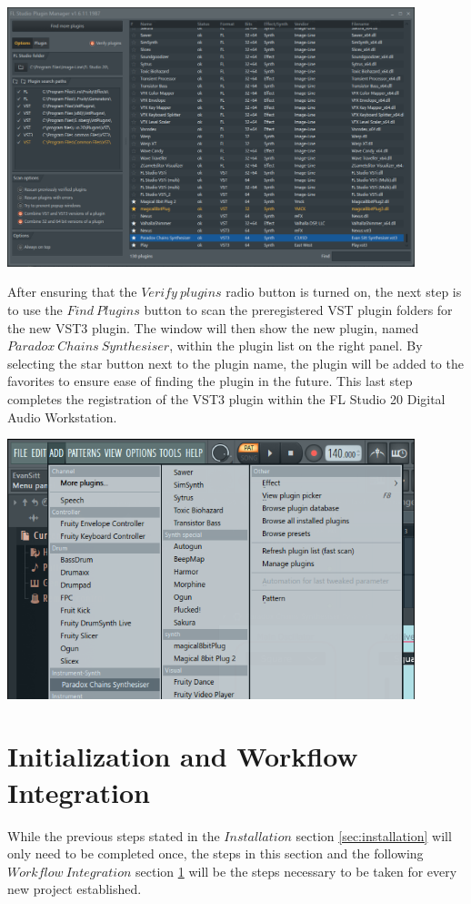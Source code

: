 \documentclass[a4paper,12pt]{report}
\begin{document}
\begin{center}
\includegraphics[width=32em]{ModuleRegistration.png}
\end{center}

After ensuring that the $Verify\ plugins$ radio button is turned on, the next step is to use the $Find\ Plugins$ button to scan the preregistered VST plugin folders for the new VST3 plugin. The window will then show the new plugin, named $Paradox\ Chains\ Synthesiser$, within the plugin list on the right panel. By selecting the star button next to the plugin name, the plugin will be added to the favorites to ensure ease of finding the plugin in the future. This last step completes the registration of the VST3 plugin within the FL Studio 20 Digital Audio Workstation.

\begin{center}
\includegraphics[width=32em]{AddPluginList.png}
\end{center}

\section{Initialization and Workflow Integration}
\label{sec:initandworkflow}
While the previous steps stated in the $Installation$ section \ref{sec:installation} will only need to be completed once, the steps in this section and the following $Workflow\ Integration$ section \ref{sec:initandworkflow} will be the steps necessary to be taken for every new project established.
\end{document}
